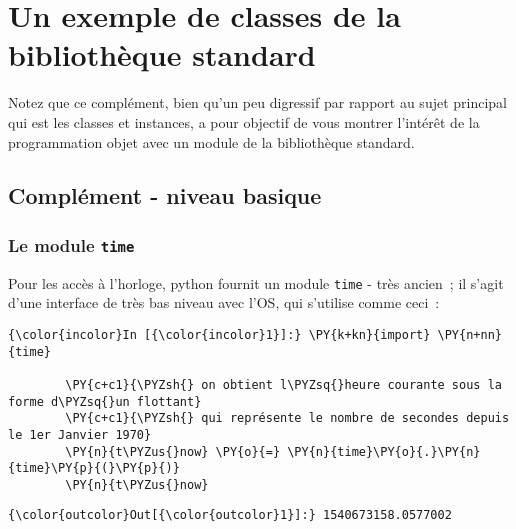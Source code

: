     
    
    
    

    

    \hypertarget{un-exemple-de-classes-de-la-bibliothuxe8que-standard}{%
\section{Un exemple de classes de la bibliothèque
standard}\label{un-exemple-de-classes-de-la-bibliothuxe8que-standard}}

    Notez que ce complément, bien qu'un peu digressif par rapport au sujet
principal qui est les classes et instances, a pour objectif de vous
montrer l'intérêt de la programmation objet avec un module de la
bibliothèque standard.

    \hypertarget{compluxe9ment---niveau-basique}{%
\subsection{Complément - niveau
basique}\label{compluxe9ment---niveau-basique}}

    \hypertarget{le-module-time}{%
\subsubsection{\texorpdfstring{Le module
\texttt{time}}{Le module time}}\label{le-module-time}}

    Pour les accès à l'horloge, python fournit un module \texttt{time} -
très ancien~; il s'agit d'une interface de très bas niveau avec l'OS,
qui s'utilise comme ceci~:

    \begin{Verbatim}[commandchars=\\\{\},frame=single,framerule=0.3mm,rulecolor=\color{cellframecolor}]
{\color{incolor}In [{\color{incolor}1}]:} \PY{k+kn}{import} \PY{n+nn}{time}
        
        \PY{c+c1}{\PYZsh{} on obtient l\PYZsq{}heure courante sous la forme d\PYZsq{}un flottant}
        \PY{c+c1}{\PYZsh{} qui représente le nombre de secondes depuis le 1er Janvier 1970}
        \PY{n}{t\PYZus{}now} \PY{o}{=} \PY{n}{time}\PY{o}{.}\PY{n}{time}\PY{p}{(}\PY{p}{)}
        \PY{n}{t\PYZus{}now}
\end{Verbatim}


\begin{Verbatim}[commandchars=\\\{\},frame=single,framerule=0.3mm,rulecolor=\color{cellframecolor}]
{\color{outcolor}Out[{\color{outcolor}1}]:} 1540673158.0577002
\end{Verbatim}
            
